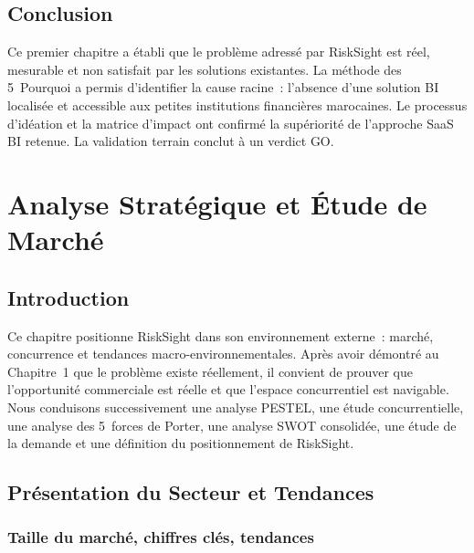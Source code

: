 \documentclass[12pt, a4paper]{report}
\begin{document}
\section{Conclusion}

Ce premier chapitre a établi que le problème adressé par RiskSight est réel,
mesurable et non satisfait par les solutions existantes. La méthode des 5~Pourquoi
a permis d'identifier la cause racine~: l'absence d'une solution BI localisée et
accessible aux petites institutions financières marocaines. Le processus d'idéation
et la matrice d'impact ont confirmé la supériorité de l'approche SaaS BI retenue.
La validation terrain conclut à un verdict GO.

\chapter{Analyse Stratégique et Étude 
de Marché}

\section{Introduction}

Ce chapitre positionne RiskSight dans son environnement externe~: marché,
concurrence et tendances macro-environnementales. Après avoir démontré au
Chapitre~1 que le problème existe réellement, il convient de prouver que
l'opportunité commerciale est réelle et que l'espace concurrentiel est navigable.
Nous conduisons successivement une analyse PESTEL, une étude concurrentielle, une
analyse des 5~forces de Porter, une analyse SWOT consolidée, une étude de la
demande et une définition du positionnement de RiskSight.

\section{Présentation du Secteur et Tendances}

\subsection{Taille du marché, chiffres clés, tendances}
\end{document}
